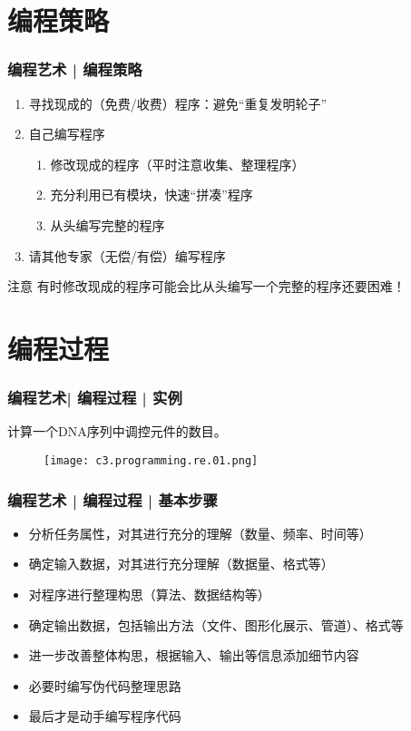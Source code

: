 \section{编程策略}
\begin{frame}
  \frametitle{编程艺术 | \alert{编程策略}}
  \begin{enumerate}
    \item 寻找现成的（免费/收费）程序：避免“重复发明轮子”
    \item 自己编写程序
      \begin{enumerate}
	\item 修改现成的程序（平时注意收集、整理程序）
	\item 充分利用已有模块，快速“拼凑”程序
	\item 从头编写完整的程序
      \end{enumerate}
    \item 请其他专家（无偿/有偿）编写程序
  \end{enumerate}
  \pause
  \begin{block}{注意}
    有时修改现成的程序可能会比从头编写一个完整的程序还要困难！
  \end{block}
\end{frame}

\section{编程过程}
\begin{frame}
  \frametitle{编程艺术| 编程过程 | 实例}
  \begin{center}
    {\Large 计算一个DNA序列中调控元件的数目。}
  \end{center}
  \begin{figure}
    \centering
    \texttt{[image: c3.programming.re.01.png]}
  \end{figure}
\end{frame}

\begin{frame}
  \frametitle{编程艺术 | 编程过程 | \alert{基本步骤}}
  \begin{itemize}
    \item 分析任务属性，对其进行充分的理解（数量、频率、时间等）
    \item 确定输入数据，对其进行充分理解（数据量、格式等）
    \item 对程序进行整理构思（算法、数据结构等）
    \item 确定输出数据，包括输出方法（文件、图形化展示、管道）、格式等
    \item 进一步改善整体构思，根据输入、输出等信息添加细节内容
    \item 必要时编写伪代码整理思路
    \item 最后才是动手编写程序代码
  \end{itemize}
\end{frame}

